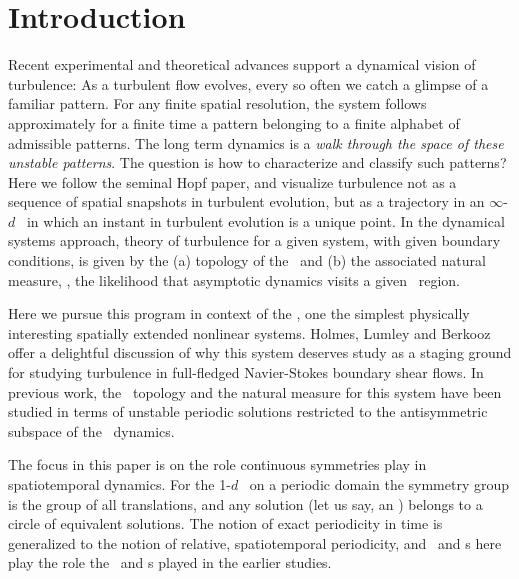 

\section{Introduction}

Recent experimental and theoretical advances
support a dynamical vision of turbulence:
As a turbulent flow evolves,
every so often we catch a glimpse of a familiar pattern.
For any finite  spatial resolution,
the system follows approximately for a finite time
a pattern belonging to a
{ finite alphabet}
of admissible patterns.
The long term dynamics is
a {\em walk through the space of these unstable patterns}.
The question is how to characterize and classify such patterns?
Here we follow the seminal Hopf paper, and  visualize
turbulence not as  a sequence of
spatial snapshots in turbulent evolution,
but as a trajectory in an
 $\infty$-$d$ \statesp\ in which an
instant in turbulent evolution is
a {unique} point. In the dynamical systems approach,
theory of turbulence for a given system, with given boundary conditions,
is given by the
(a) topology of the \statesp\ and (b) the associated natural measure,
\ie,
the likelihood that asymptotic dynamics visits a given \statesp\ region.

Here we pursue this program in context of
the \KSe, %
one the
simplest physically interesting spatially extended nonlinear systems.
Holmes, Lumley
and Berkooz offer a delightful discussion of why this system
deserves study as a staging ground for studying turbulence in
full-fledged Navier-Stokes boundary shear flows.
In previous work,
the \statesp\ topology and the natural measure for
this system have been studied
in terms of unstable periodic solutions
restricted to
the antisymmetric subspace of the \KS\ dynamics.

The focus in this paper is on the role continuous symmetries
play in spatiotemporal dynamics. For the 1-$d$ \KS\ on a periodic domain
the symmetry group is the group of all translations, and
any solution (let us say, an \eqv ) belongs to a circle of equivalent
solutions. The notion of exact periodicity in time is
generalized to the notion of relative, spatiotemporal periodicity, and
\reqva\ and \rpo s here play the role the \eqva\ and
\po s played in the earlier studies.


